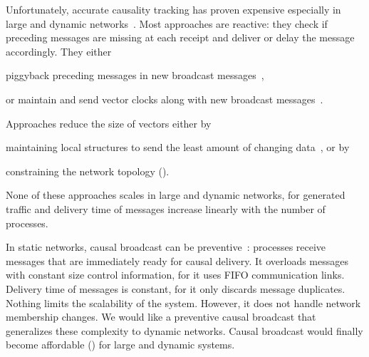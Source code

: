 Unfortunately, accurate causality tracking has proven expensive especially in
large and dynamic networks~\cite{charronbost1991concerning}. Most approaches are
reactive: they check if preceding messages are missing at each receipt and
deliver or delay the message accordingly. They either
\begin{inparaenum}[(i)]
\item piggyback preceding messages in new broadcast
  messages~\cite{birman1987reliable,hadzilacos1993fault},
\item or maintain and send vector clocks along with new broadcast
  messages~\cite{fidge1988timestamps,mattern1989virtual}.
\end{inparaenum}
Approaches reduce the size of vectors either by
\begin{inparaenum}[(a)]
\item maintaining local structures to send the least amount of changing
  data~\cite{singhal1992efficient}, or by
\item constraining the network topology (\REF).
\end{inparaenum}
None of these approaches scales in large and dynamic networks, for
generated traffic and delivery time of messages increase linearly with the
number of processes.

In static networks, causal broadcast can be
preventive~\cite{friedman2004causal}: processes receive messages that are
immediately ready for causal delivery. It overloads messages with constant size
control information, for it uses FIFO communication links. Delivery time of
messages is constant, for it only discards message duplicates. Nothing limits
the scalability of the system.
However, it does not handle network membership changes. We would like a
preventive causal broadcast that generalizes these complexity to dynamic
networks. Causal broadcast would finally become affordable () for large and dynamic systems.


